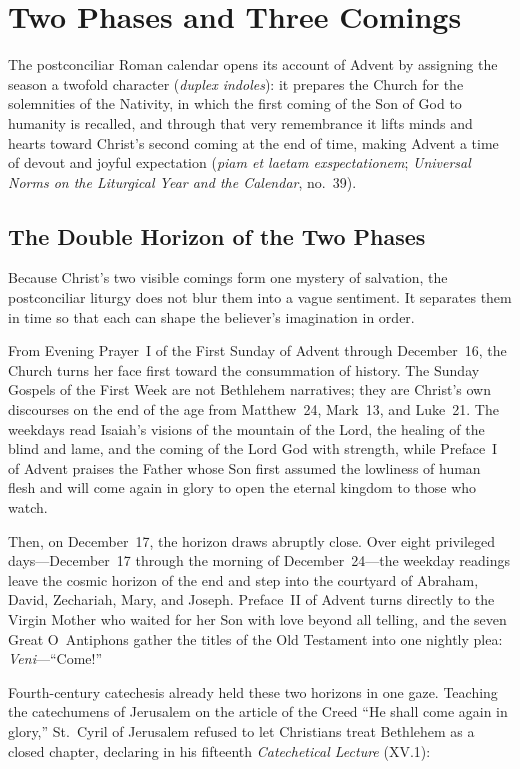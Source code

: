 \section{Two Phases and Three Comings}\label{sec:theology}

The postconciliar Roman calendar opens its account of Advent by assigning the season a twofold character (\textit{duplex indoles}): it prepares the Church for the solemnities of the Nativity, in which the first coming of the Son of God to humanity is recalled, and through that very remembrance it lifts minds and hearts toward Christ's second coming at the end of time, making Advent a time of devout and joyful expectation (\textit{piam et laetam exspectationem}; \textit{Universal Norms on the Liturgical Year and the Calendar}, no.~39).

\subsection{The Double Horizon of the Two Phases}

Because Christ's two visible comings form one mystery of salvation, the postconciliar liturgy does not blur them into a vague sentiment. It separates them in time so that each can shape the believer's imagination in order.

From Evening Prayer~I of the First Sunday of Advent through December~16, the Church turns her face first toward the consummation of history. The Sunday Gospels of the First Week are not Bethlehem narratives; they are Christ's own discourses on the end of the age from Matthew~24, Mark~13, and Luke~21. The weekdays read Isaiah's visions of the mountain of the Lord, the healing of the blind and lame, and the coming of the Lord God with strength, while Preface~I of Advent praises the Father whose Son first assumed the lowliness of human flesh and will come again in glory to open the eternal kingdom to those who watch.

Then, on December~17, the horizon draws abruptly close. Over eight privileged days---December~17 through the morning of December~24---the weekday readings leave the cosmic horizon of the end and step into the courtyard of Abraham, David, Zechariah, Mary, and Joseph. Preface~II of Advent turns directly to the Virgin Mother who waited for her Son with love beyond all telling, and the seven Great O~Antiphons gather the titles of the Old Testament into one nightly plea: \textit{Veni}---``Come!''

Fourth-century catechesis already held these two horizons in one gaze. Teaching the catechumens of Jerusalem on the article of the Creed ``He shall come again in glory,'' St.~Cyril of Jerusalem refused to let Christians treat Bethlehem as a closed chapter, declaring in his fifteenth \textit{Catechetical Lecture} (XV.1):

